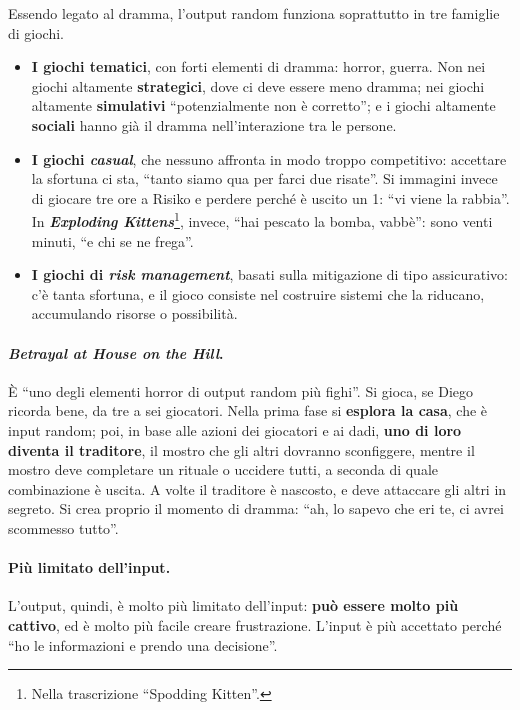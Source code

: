 Essendo legato al dramma, l'output random funziona soprattutto in tre famiglie di giochi.
\begin{itemize}
  \item \textbf{I giochi tematici}, con forti elementi di dramma: horror, guerra. Non nei
        giochi altamente \textbf{strategici}, dove ci deve essere meno dramma; nei giochi
        altamente \textbf{simulativi} ``potenzialmente non è corretto''; e i giochi altamente
        \textbf{sociali} hanno già il dramma nell'interazione tra le persone.
  \item \textbf{I giochi \emph{casual}}, che nessuno affronta in modo troppo competitivo:
        accettare la sfortuna ci sta, ``tanto siamo qua per farci due risate''. Si immagini
        invece di giocare tre ore a Risiko e perdere perché è uscito un 1: ``vi viene la
        rabbia''. In \textbf{\emph{Exploding Kittens}}\footnote{Nella trascrizione ``Spodding
        Kitten''.}, invece, ``hai pescato la bomba, vabbè'': sono venti minuti, ``e chi se ne
        frega''.
  \item \textbf{I giochi di \emph{risk management}}, basati sulla mitigazione di tipo
        assicurativo: c'è tanta sfortuna, e il gioco consiste nel costruire sistemi che la
        riducano, accumulando risorse o possibilità.
\end{itemize}

\paragraph{\emph{Betrayal at House on the Hill}.} È ``uno degli elementi horror di output
random più fighi''. Si gioca, se Diego ricorda bene, da tre a sei giocatori. Nella prima fase
si \textbf{esplora la casa}, che è input random; poi, in base alle azioni dei giocatori e ai
dadi, \textbf{uno di loro diventa il traditore}, il mostro che gli altri dovranno sconfiggere,
mentre il mostro deve completare un rituale o uccidere tutti, a seconda di quale combinazione
è uscita. A volte il traditore è nascosto, e deve attaccare gli altri in segreto. Si crea
proprio il momento di dramma: ``ah, lo sapevo che eri te, ci avrei scommesso tutto''.

\paragraph{Più limitato dell'input.} L'output, quindi, è molto più limitato dell'input:
\textbf{può essere molto più cattivo}, ed è molto più facile creare frustrazione. L'input è
più accettato perché ``ho le informazioni e prendo una decisione''.

